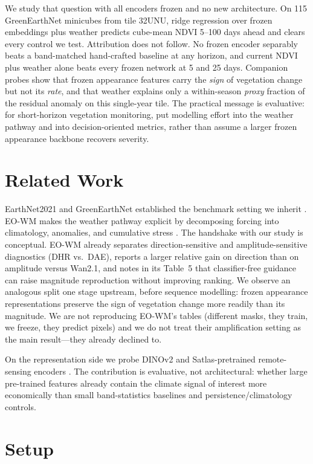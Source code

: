 \documentclass[10pt,twocolumn]{article}
\begin{document}
We study that question with all encoders frozen and no new architecture. On 115
GreenEarthNet minicubes from tile 32UNU, ridge regression over frozen embeddings
plus weather predicts cube-mean NDVI 5--100 days ahead and clears every control
we test. Attribution does not follow. No frozen encoder separably beats a
band-matched hand-crafted baseline at any horizon, and current NDVI plus weather
alone beats every frozen network at 5 and 25 days. Companion probes show that
frozen appearance features carry the \emph{sign} of vegetation change but not
its \emph{rate}, and that weather explains only a within-season
\emph{proxy} fraction of the residual anomaly on this single-year tile. The
practical message is evaluative: for short-horizon vegetation monitoring, put
modelling effort into the weather pathway and into decision-oriented metrics,
rather than assume a larger frozen appearance backbone recovers severity.

\section{Related Work}
EarthNet2021 and GreenEarthNet established the benchmark setting we inherit
\citep{requena2021earthnet2021,benson2024greenearthnet}. EO-WM makes the weather
pathway explicit by decomposing forcing into climatology, anomalies, and
cumulative stress \citep{luo2026eowm}. The handshake with our study is
conceptual. EO-WM already separates direction-sensitive and amplitude-sensitive
diagnostics (DHR vs.\ DAE), reports a larger relative gain on direction than on
amplitude versus Wan2.1, and notes in its Table~5 that classifier-free guidance
can raise magnitude reproduction without improving ranking. We observe an
analogous split one stage upstream, before sequence modelling: frozen appearance
representations preserve the sign of vegetation change more readily than its
magnitude. We are not reproducing EO-WM's tables (different masks, they train,
we freeze, they predict pixels) and we do not treat their amplification setting
as the main result---they already declined to.

On the representation side we probe DINOv2 \citep{oquab2024dinov2} and
Satlas-pretrained remote-sensing encoders \citep{bastani2023satlaspretrain}.
The contribution is evaluative, not architectural: whether large pre-trained
features already contain the climate signal of interest more economically than
small band-statistics baselines and persistence/climatology controls.

\section{Setup}
\end{document}

